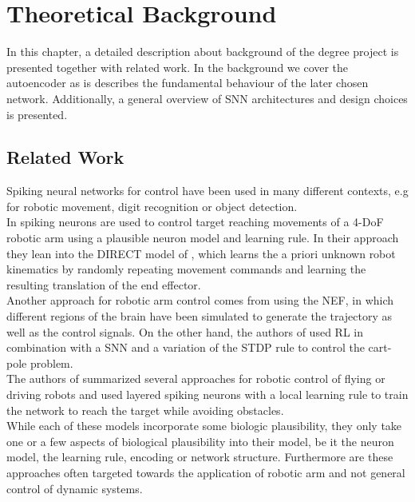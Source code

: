\chapter{Theoretical Background}
In this chapter, a detailed description about background of the degree project is presented together with related work. In the background we cover the autoencoder as is describes the fundamental behaviour of the later chosen network. Additionally, a general overview of \ac{SNN} architectures and design choices is presented.\\

\section{Related Work}
Spiking neural networks for control have been used in many different contexts, e.g for robotic movement, digit recognition\cite{lee_training_2016} or object detection\cite{soures_deep_2019,zhou_deep_2020}.\\
In \cite{bouganis_training_2010} spiking neurons are used to control target reaching movements of a 4-DoF robotic arm using a plausible neuron model and learning rule. In their approach they lean into the DIRECT model of \cite{bullock_self-organizing_1993}, which learns the a priori unknown robot kinematics by randomly repeating movement commands and learning the resulting translation of the end effector.\\
Another approach for robotic arm control comes from \cite{dewolf_spiking_2016} using the \ac{NEF}\cite{eliasmith_neural_2004}, in which different regions of the brain have been simulated to generate the trajectory as well as the control signals. On the other hand, the authors of \cite{liu_spiking_2023} used \ac{RL} in combination with a \ac{SNN} and a variation of the \ac{STDP} rule to control the cart-pole problem.\\
The authors of \cite{bing_supervised_2019} summarized several approaches for robotic control of flying or driving robots and used layered spiking neurons with a local learning rule to train the network to reach the target while avoiding obstacles.\\
While each of these models incorporate some biologic plausibility, they only take one or a few aspects of biological plausibility into their model, be it the neuron model, the learning rule, encoding or network structure. Furthermore are these approaches often targeted towards the application of robotic arm and not general control of dynamic systems.\\
